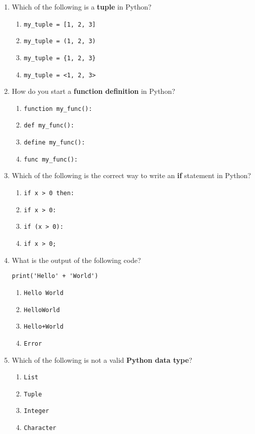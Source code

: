 \documentclass[twocolumn]{article}
\begin{document}
\begin{enumerate}
\item Which of the following is a \textbf{tuple} in Python?
\begin{enumerate}
    \item \texttt{my\_tuple = [1, 2, 3]}
    \item \texttt{my\_tuple = (1, 2, 3)}
    \item \texttt{my\_tuple = \{1, 2, 3\}}
    \item \texttt{my\_tuple = <1, 2, 3>}
\end{enumerate}

\item How do you start a \textbf{function definition} in Python?
\begin{enumerate}
    \item \texttt{function my\_func():}
    \item \texttt{def my\_func():}
    \item \texttt{define my\_func():}
    \item \texttt{func my\_func():}
\end{enumerate}

\item Which of the following is the correct way to write an \textbf{if} statement in Python?
\begin{enumerate}
    \item \texttt{if x > 0 then:}
    \item \texttt{if x > 0:}
    \item \texttt{if (x > 0):}
    \item \texttt{if x > 0;}
\end{enumerate}

\item What is the output of the following code?
\begin{verbatim}
print('Hello' + 'World')
\end{verbatim}
\begin{enumerate}
    \item \texttt{Hello World}
    \item \texttt{HelloWorld}
    \item \texttt{Hello+World}
    \item \texttt{Error}
\end{enumerate}

\item Which of the following is not a valid \textbf{Python data type}?
\begin{enumerate}
    \item \texttt{List}
    \item \texttt{Tuple}
    \item \texttt{Integer}
    \item \texttt{Character}
\end{enumerate}


\end{enumerate}
\end{document}
